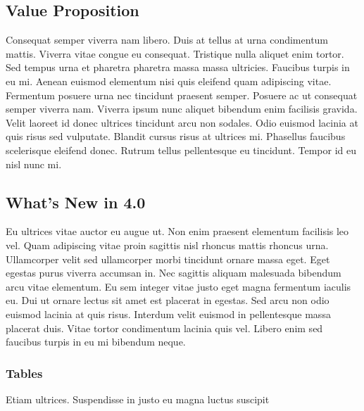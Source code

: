 \documentclass[peerreview]{ieeesyscoin}
\begin{document}
\subsection{Value Proposition}
Consequat semper viverra nam libero. Duis at tellus at urna condimentum mattis. Viverra vitae congue eu consequat. Tristique nulla aliquet enim tortor. Sed tempus urna et pharetra pharetra massa massa ultricies. Faucibus turpis in eu mi. Aenean euismod elementum nisi quis eleifend quam adipiscing vitae. Fermentum posuere urna nec tincidunt praesent semper. Posuere ac ut consequat semper viverra nam. Viverra ipsum nunc aliquet bibendum enim facilisis gravida. Velit laoreet id donec ultrices tincidunt arcu non sodales. Odio euismod lacinia at quis risus sed vulputate. Blandit cursus risus at ultrices mi. Phasellus faucibus scelerisque eleifend donec. Rutrum tellus pellentesque eu tincidunt. Tempor id eu nisl nunc mi.

\subsection{What's New in 4.0}
Eu ultrices vitae auctor eu augue ut. Non enim praesent elementum facilisis leo vel. Quam adipiscing vitae proin sagittis nisl rhoncus mattis rhoncus urna. Ullamcorper velit sed ullamcorper morbi tincidunt ornare massa eget. Eget egestas purus viverra accumsan in. Nec sagittis aliquam malesuada bibendum arcu vitae elementum. Eu sem integer vitae justo eget magna fermentum iaculis eu. Dui ut ornare lectus sit amet est placerat in egestas. Sed arcu non odio euismod lacinia at quis risus. Interdum velit euismod in pellentesque massa placerat duis. Vitae tortor condimentum lacinia quis vel. Libero enim sed faucibus turpis in eu mi bibendum neque.

\subsubsection{Tables}
{Etiam ultrices. Suspendisse in justo eu magna luctus suscipit}
\end{document}
